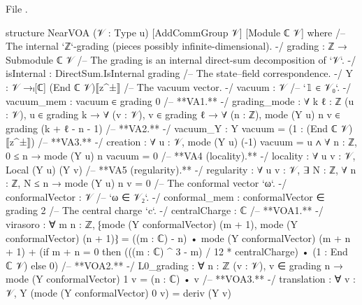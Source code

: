 \noindent File .
\begin{leancode}
structure NearVOA (𝒱 : Type u) [AddCommGroup 𝒱] [Module ℂ 𝒱] where
  /-- The internal `ℤ`-grading (pieces possibly infinite-dimensional). -/
  grading : ℤ → Submodule ℂ 𝒱
  /-- The grading is an internal direct-sum decomposition of `𝒱`. -/
  isInternal : DirectSum.IsInternal grading
  /-- The state–field correspondence. -/
  Y : 𝒱 →ₗ[ℂ] (End ℂ 𝒱)⟦z^±⟧
  /-- The vacuum vector. -/
  vacuum : 𝒱
  /-- `𝟙 ∈ 𝒱₀`. -/
  vacuum_mem : vacuum ∈ grading 0
  /-- **VA1.** -/
  grading_mode : ∀ {k ℓ : ℤ} (u : 𝒱), u ∈ grading k → ∀ (v : 𝒱), v ∈ grading ℓ →
    ∀ (n : ℤ), mode (Y u) n v ∈ grading (k + ℓ - n - 1)
  /-- **VA2.** -/
  vacuum_Y : Y vacuum = (1 : (End ℂ 𝒱)⟦z^±⟧)
  /-- **VA3.** -/
  creation : ∀ u : 𝒱, mode (Y u) (-1) vacuum = u ∧ ∀ n : ℤ, 0 ≤ n → mode (Y u) n vacuum = 0
  /-- **VA4 (locality).** -/
  locality : ∀ u v : 𝒱, Local (Y u) (Y v)
  /-- **VA5 (regularity).** -/
  regularity : ∀ u v : 𝒱, ∃ N : ℤ, ∀ n : ℤ, N ≤ n → mode (Y u) n v = 0
  /-- The conformal vector `ω`. -/
  conformalVector : 𝒱
  /-- `ω ∈ 𝒱₂`. -/
  conformal_mem : conformalVector ∈ grading 2
  /-- The central charge `c`. -/
  centralCharge : ℂ
  /-- **VOA1.** -/
  virasoro : ∀ m n : ℤ,
      ⁅mode (Y conformalVector) (m + 1), mode (Y conformalVector) (n + 1)⁆
        = ((m : ℂ) - n) • mode (Y conformalVector) (m + n + 1)
          + (if m + n = 0 then (((m : ℂ) ^ 3 - m) / 12 * centralCharge) • (1 : End ℂ 𝒱)
             else 0)
  /-- **VOA2.** -/
  L0_grading : ∀ {n : ℤ} (v : 𝒱), v ∈ grading n → mode (Y conformalVector) 1 v = (n : ℂ) • v
  /-- **VOA3.** -/
  translation : ∀ v : 𝒱, Y (mode (Y conformalVector) 0 v) = deriv (Y v)
\end{leancode}


